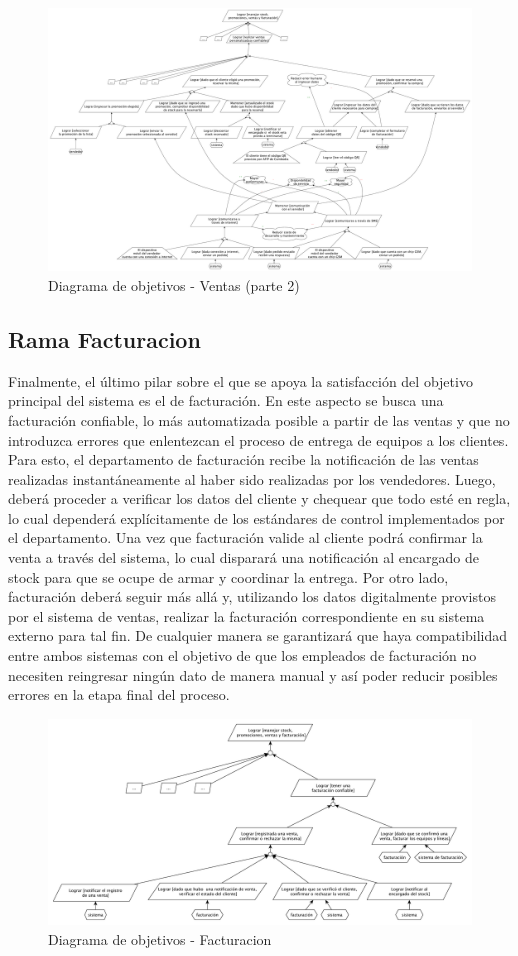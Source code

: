 \begin{figure}[h!]
  \centering
  \includegraphics[width=1.5\textwidth, angle=90]{./imagenes/ventas_2.pdf}
  \caption{Diagrama de objetivos - Ventas (parte 2)}
\end{figure}

\clearpage

\subsection{Rama Facturacion}

Finalmente, el último pilar sobre el que se apoya la satisfacción del objetivo principal del sistema es el de facturación. En este aspecto se busca una facturación confiable, lo más automatizada posible a partir de las ventas y que no introduzca errores que enlentezcan el proceso de entrega de equipos a los clientes. Para esto, el departamento de facturación recibe la notificación de las ventas realizadas instantáneamente al haber sido realizadas por los vendedores. Luego, deberá proceder a verificar los datos del cliente y chequear que todo esté en regla, lo cual dependerá explícitamente de los estándares de control implementados por el departamento. Una vez que facturación valide al cliente podrá confirmar la venta a través del sistema, lo cual disparará una notificación al encargado de stock para que se ocupe de armar y coordinar la entrega. Por otro lado, facturación deberá seguir más allá y, utilizando los datos digitalmente provistos por el sistema de ventas, realizar la facturación correspondiente en su sistema externo para tal fin. De cualquier manera se garantizará que haya compatibilidad entre ambos sistemas con el objetivo de que los empleados de facturación no necesiten reingresar ningún dato de manera manual y así poder reducir posibles errores en la etapa final del proceso.

\begin{figure}[h!]
  \centering
  \includegraphics[width=1\textwidth]{./imagenes/facturacion.pdf}
  \caption{Diagrama de objetivos - Facturacion}
\end{figure}

